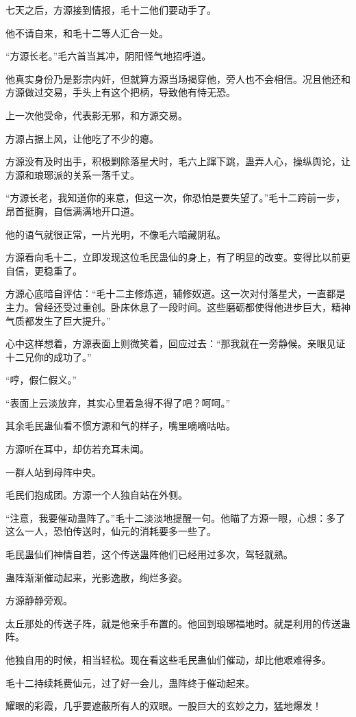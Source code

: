 \begin{this_body}
七天之后，方源接到情报，毛十二他们要动手了。

他不请自来，和毛十二等人汇合一处。

“方源长老。”毛六首当其冲，阴阳怪气地招呼道。

他真实身份乃是影宗内奸，但就算方源当场揭穿他，旁人也不会相信。况且他还和方源做过交易，手头上有这个把柄，导致他有恃无恐。

上一次他受命，代表影无邪，和方源交易。

方源占据上风，让他吃了不少的瘪。

方源没有及时出手，积极剿除落星犬时，毛六上蹿下跳，蛊弄人心，操纵舆论，让方源和琅琊派的关系一落千丈。

“方源长老，我知道你的来意，但这一次，你恐怕是要失望了。”毛十二跨前一步，昂首挺胸，自信满满地开口道。

他的语气就很正常，一片光明，不像毛六暗藏阴私。

方源看向毛十二，立即发现这位毛民蛊仙的身上，有了明显的改变。变得比以前更自信，更稳重了。

方源心底暗自评估：“毛十二主修炼道，辅修奴道。这一次对付落星犬，一直都是主力。曾经还受过重创。卧床休息了一段时间。这些磨砺都使得他进步巨大，精神气质都发生了巨大提升。”

心中这样想着，方源表面上则微笑着，回应过去：“那我就在一旁静候。亲眼见证十二兄你的成功了。”

“哼，假仁假义。”

“表面上云淡放弃，其实心里着急得不得了吧？呵呵。”

其余毛民蛊仙看不惯方源和气的样子，嘴里嘀嘀咕咕。

方源听在耳中，却仿若充耳未闻。

一群人站到母阵中央。

毛民们抱成团。方源一个人独自站在外侧。

“注意，我要催动蛊阵了。”毛十二淡淡地提醒一句。他瞄了方源一眼，心想：多了这么一人，恐怕传送时，仙元的消耗要多一些了。

毛民蛊仙们神情自若，这个传送蛊阵他们已经用过多次，驾轻就熟。

蛊阵渐渐催动起来，光影逸散，绚烂多姿。

方源静静旁观。

太丘那处的传送子阵，就是他亲手布置的。他回到琅琊福地时。就是利用的传送蛊阵。

他独自用的时候，相当轻松。现在看这些毛民蛊仙们催动，却比他艰难得多。

毛十二持续耗费仙元，过了好一会儿，蛊阵终于催动起来。

耀眼的彩霞，几乎要遮蔽所有人的双眼。一股巨大的玄妙之力，猛地爆发！


\end{this_body}
